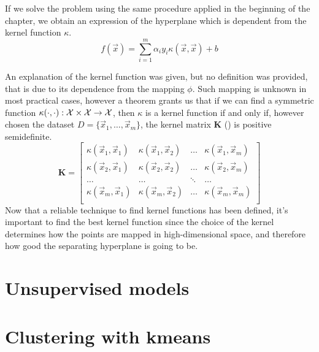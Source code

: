 If we solve the problem using the same procedure applied in the beginning of the chapter, we obtain
an expression of the hyperplane which is dependent from the kernel function $\kappa$.
\begin{equation}
	\label{eq:hd-of}
	f(\vec{x}) = \sum_{i = 1}^m\alpha_iy_i\kappa(\vec{x}, \vec{x}) + b
\end{equation}

An explanation of the kernel function was given, but no definition was provided, that is due to its
dependence from the mapping $\phi$. Such mapping is unknown in most practical cases, however a
theorem \cite{learning-with-kernels} grants us that if we can find a symmetric function
$\kappa(\cdot, \cdot): \mathcal{X} \times \mathcal{X} \rightarrow \mathcal{X}$, then $\kappa$ is a kernel function if and
only if, however chosen the dataset $D = \{\vec{x}_1, \ldots, \vec{x}_m\}$, the kernel matrix
$\mathbf{K}$ () is positive semidefinite.
\begin{equation}
	\label{eq:kernel-matrix}
	\mathbf{K} =
	\begin{bmatrix}
		\kappa(\vec{x}_1, \vec{x}_1) & \kappa(\vec{x}_1, \vec{x}_2) & \ldots &
		\kappa(\vec{x}_1, \vec{x}_m)                                                  \\
		\kappa(\vec{x}_2, \vec{x}_1) & \kappa(\vec{x}_2, \vec{x}_2) & \ldots &
		\kappa(\vec{x}_2, \vec{x}_m)                                                  \\
		\ldots                       & \ldots                       & \ddots & \ldots \\
		\kappa(\vec{x}_m, \vec{x}_1) & \kappa(\vec{x}_m, \vec{x}_2) & \ldots &
		\kappa(\vec{x}_m, \vec{x}_m)                                                  \\
	\end{bmatrix}
\end{equation}
Now that a reliable technique to find kernel functions has been defined, it's important to find the
best kernel function since the choice of the kernel determines how the points are mapped in
high-dimensional space, and therefore how good the separating hyperplane is going to be.

\section{Unsupervised models}
\label{sec:uml}

\section{Clustering with k\-means}
\label{sec:kmeans}

